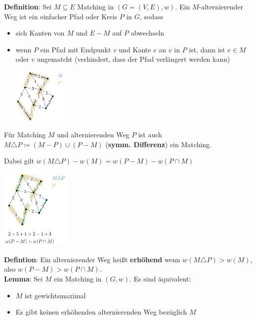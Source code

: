 \bigskip
\textbf{Definition}: Sei $M\subseteq E$ Matching in $(G = (V, E), w)$. Ein $M$-alternierender Weg ist ein einfacher Pfad oder Kreis $P$ in $G$, sodass
\begin{itemize}
	\item sich Kanten von $M$ und $E- M$ auf $P$ abwechseln
	\item wenn $P$ ein Pfad mit Endpunkt $v$ und Kante $e$ an $v$ in $P$ ist, dann ist $e\in M$ oder $v$ ungematcht (verhindert, dass der Pfad verlängert werden kann)
	\begin{center}
		\includegraphics[width=0.2\textwidth]{images/alternating-path.png}
	\end{center}
\end{itemize}
Für Matching $M$ und alternierenden Weg $P$ ist auch $M\triangle P\coloneqq (M- P)\cup(P- M)$ (\textbf{symm. Differenz}) ein Matching.

Dabei gilt $w(M\triangle P)-w(M)=w(P- M)-w(P\cap M)$

\begin{center}
	\includegraphics[width=0.25\textwidth]{images/sym-diff.png}
\end{center}
\bigskip
\textbf{Defintion}: Ein alternierender Weg heißt \textbf{erhöhend} wenn $w(M\triangle P)>w(M)$, also $w(P-M)>w(P\cap M)$.\\

\textbf{Lemma}: Sei $M$ ein Matching in $(G, w)$. Es sind äquivalent:
\begin{itemize}
	\item $M$ ist gewichtsmaximal
	\item Es gibt keinen erhöhenden alternierenden Weg bezüglich $M$
\end{itemize}
\pagebreak

